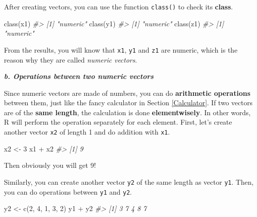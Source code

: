 \documentclass[
]{book}
\newenvironment{Shaded}{\begin{snugshade}}{\end{snugshade}}
\newcommand{\CommentTok}[1]{\textcolor[rgb]{0.56,0.35,0.01}{\textit{#1}}}
\newcommand{\DecValTok}[1]{\textcolor[rgb]{0.00,0.00,0.81}{#1}}
\newcommand{\FunctionTok}[1]{\textcolor[rgb]{0.00,0.00,0.00}{#1}}
\newcommand{\NormalTok}[1]{#1}
\newcommand{\OtherTok}[1]{\textcolor[rgb]{0.56,0.35,0.01}{#1}}
\newcommand{\SpecialCharTok}[1]{\textcolor[rgb]{0.00,0.00,0.00}{#1}}
\begin{document}
After creating vectors, you can use the function \texttt{class()} to check its \textbf{class}.

\begin{Shaded}
\begin{Highlighting}[]
\FunctionTok{class}\NormalTok{(x1)}
\CommentTok{\#\textgreater{} [1] "numeric"}
\FunctionTok{class}\NormalTok{(y1)}
\CommentTok{\#\textgreater{} [1] "numeric"}
\FunctionTok{class}\NormalTok{(z1)}
\CommentTok{\#\textgreater{} [1] "numeric"}
\end{Highlighting}
\end{Shaded}

From the results, you will know that \texttt{x1}, \texttt{y1} and \texttt{z1} are numeric, which is the reason why they are called \emph{numeric vectors}.

\textbf{\emph{b. Operations between two numeric vectors}}

Since numeric vectors are made of numbers, you can do \textbf{arithmetic operations} between them, just like the fancy calculator in Section \ref{Calculator}. If two vectors are of the \textbf{same length}, the calculation is done \textbf{elementwisely}. In other words, R will perform the operation separately for each element. First, let's create another vector \texttt{x2} of length 1 and do addition with \texttt{x1}.

\begin{Shaded}
\begin{Highlighting}[]
\NormalTok{x2 }\OtherTok{\textless{}{-}} \DecValTok{3}
\NormalTok{x1 }\SpecialCharTok{+}\NormalTok{ x2}
\CommentTok{\#\textgreater{} [1] 9}
\end{Highlighting}
\end{Shaded}

Then obviously you will get 9!

Similarly, you can create another vector \texttt{y2} of the same length as vector \texttt{y1}. Then, you can do operations between \texttt{y1} and \texttt{y2}.

\begin{Shaded}
\begin{Highlighting}[]
\NormalTok{y2 }\OtherTok{\textless{}{-}} \FunctionTok{c}\NormalTok{(}\DecValTok{2}\NormalTok{, }\DecValTok{4}\NormalTok{, }\DecValTok{1}\NormalTok{, }\DecValTok{3}\NormalTok{, }\DecValTok{2}\NormalTok{)}
\NormalTok{y1 }\SpecialCharTok{+}\NormalTok{ y2}
\CommentTok{\#\textgreater{} [1] 3 7 4 8 7}
\end{Highlighting}
\end{Shaded}
\end{document}
